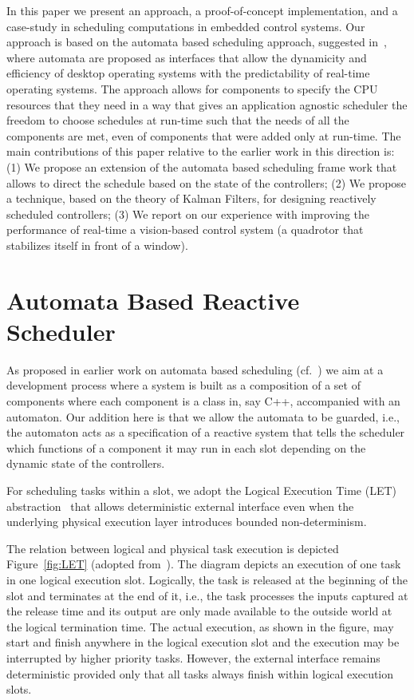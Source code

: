 \documentclass{sig-alternate-ipsn13}
\begin{document}
In this paper we present an approach, a proof-of-concept implementation, and a case-study in scheduling computations in embedded control systems. Our approach is based on the automata based scheduling approach, suggested in~\cite{WA07,RTComposer,AW08}, where automata are proposed as interfaces that allow the dynamicity and efficiency of desktop operating systems with the predictability of real-time operating systems. The approach allows for components to specify the CPU resources that they need in a way that gives an application agnostic scheduler the freedom to choose schedules at run-time such that the needs of all the components are met, even of components that were added only at run-time.  The main contributions of this paper relative to the earlier work in this direction is:
(1) We propose an extension of the automata based scheduling frame work that allows to direct the schedule based on the state of the controllers; (2) We propose a technique, based on the theory of Kalman Filters, for designing reactively scheduled controllers; (3) We report on our experience with improving the performance of real-time a vision-based control system (a quadrotor that stabilizes itself in front of a window).

\section{Automata Based Reactive Scheduler}
\label{sec:architecture}

As proposed in earlier work on automata based scheduling (cf.~\cite{WA07,RTComposer,AW08}) we aim at a development process where a system is built as a composition of a set of components where each component is a class in, say C++, accompanied with an automaton. Our addition here is that we allow the automata to be guarded, i.e., the automaton acts as a specification of a reactive system that tells the scheduler which functions of a component it may run in each slot depending on the dynamic state of the controllers.

For scheduling tasks within a slot, we adopt the Logical Execution Time (LET)
abstraction~\cite{DBLP:journals/pieee/HenzingerHK03} that allows deterministic
external interface even when the underlying physical execution layer introduces
bounded non-determinism.

The relation between logical and physical task execution is depicted Figure~\ref{fig:LET} (adopted
from~\cite{DBLP:conf/lctrts/FarcasFPT05}). The diagram depicts an execution of one task in one
logical execution slot.  Logically, the task is released at the beginning of the slot and terminates
at the end of it, i.e., the task processes the inputs captured at the release time and its output
are only made available to the outside world at the logical termination time. The actual execution,
as shown in the figure, may start and finish anywhere in the logical execution slot and the
execution may be interrupted by higher priority tasks. However, the external interface remains
deterministic provided only that all tasks always finish within logical execution slots.
\end{document}
